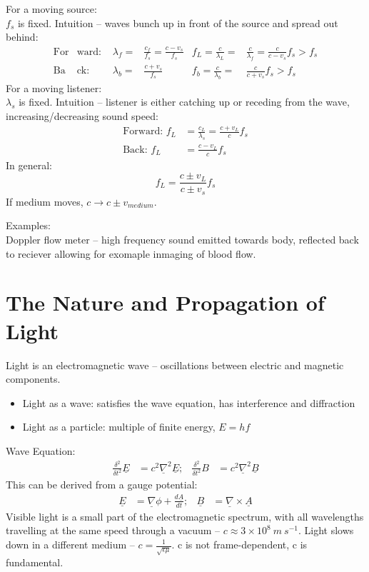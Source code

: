 \documentclass[a4paper, 11pt, normalem]{report}
\begin{document}
For a moving source: \\
$f_{s}$ is fixed.
Intuition -- waves bunch up in front of the source and spread out behind:
\begin{align}
    \text{For}&\text{ward: } & \lambda_{f} =& \frac{c_{f}}{f_{s}} = \frac{c - v_{s}}{f_{s}} & f_{L} = \frac{c}{\lambda_{L}} =& \frac{c}{\lambda_{f}} = \frac{c}{c - v_{s}}f_{s} > f_{s} \\
    \text{Ba}&\text{ck: } & \lambda_{b} =& \frac{c + v_{s}}{f_{s}} & f_{b} = \frac{c}{\lambda_{b}} =& \frac{c}{c + v_{s}}f_{s} > f_{s}
\end{align}
For a moving listener: \\
$\lambda_{s}$ is fixed.
Intuition -- listener is either catching up or receding from the wave, increasing/decreasing sound speed:
\begin{align}
    \text{Forward: } f_{L} &= \frac{c_{L}}{\lambda_{s}} = \frac{c + v_{L}}{c}f_{s} \\
    \text{Back: } f_{L} &= \frac{c - v_{L}}{c}f_{s}
\end{align}
In general:
\begin{equation}
    f_{L} = \frac{c \pm v_{L}}{c \pm v_{s}}f_{s}
\end{equation}
If medium moves, $c \rightarrow c \pm v_{medium}$.

Examples: \\
Doppler flow meter -- high frequency sound emitted towards body, reflected back to reciever allowing for exomaple inmaging of blood flow.

\section{The Nature and Propagation of Light}
Light is an electromagnetic wave -- oscillations between electric and magnetic components.
\begin{itemize}
    \item Light as a wave: satisfies the wave equation, has interference and diffraction
    \item Light as a particle: multiple of finite energy, $E = hf$ 
\end{itemize}
Wave Equation: 
\begin{align}
    \frac{\delta^{2}}{\delta t^{2}}\underline{E} &= c^{2}\underline{\nabla}^{2}\underline{E};& \frac{\delta^{2}}{\delta t^{2}}B &= c^{2}\underline{\nabla}^{2}\underline{B}
\end{align}
This can be derived from a gauge potential: 
\begin{align}
    \underline{E} &= \underline{\nabla}\phi + \frac{d\underline{A}}{dt};& \underline{B} &= \underline{\nabla}\times\underline{A}
\end{align}
Visible light is a small part of the electromagnetic spectrum, with all wavelengths travelling at the same speed through a vacuum -- $c \approx 3\times10^{8}\:m\:s^{-1}$.
Light slows down in a different medium -- $c = \frac{1}{\sqrt{\epsilon\mu}}$.
c is not frame-dependent, c is fundamental.
\end{document}
